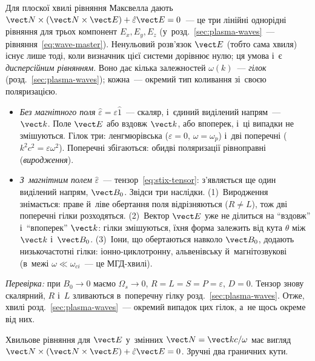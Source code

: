 \begin{Theory}
Для плоскої хвилі рівняння Максвелла дають $\vect N\times(\vect N\times\vect E)+\hat\varepsilon\vect E=0$~--- це
три лінійні однорідні рівняння для трьох компонент $E_x,E_y,E_z$ (у~розд.~\ref{sec:plasma-waves}~--- рівняння~\eqref{eq:wave-master}).
Ненульовий розв'язок $\vect E$ (тобто сама хвиля) існує лише тоді, коли визначник цієї системи дорівнює нулю; ця умова
і~є \emph{дисперсійним рівнянням}. Воно дає кілька залежностей $\omega(k)$~--- \emph{гілок} (розд.~\ref{sec:plasma-waves}); кожна~--- окремий тип коливання зі~своєю поляризацією.
\begin{itemize}
	\item \emph{Без магнітного поля} $\hat\varepsilon=\varepsilon\hat1$~--- скаляр, і~єдиний виділений напрям~--- $\vect k$.
	  Поле $\vect E$ або вздовж $\vect k$, або впоперек, і~ці випадки не змішуються. Гілок три: ленгмюрівська ($\varepsilon=0$,
	  $\omega=\omega_p$) і~дві поперечні ($k^2c^2=\varepsilon\omega^2$). Поперечні збігаються: обидві поляризації рівноправні
	  (\emph{виродження}).
	\item \emph{З~магнітним полем} $\hat\varepsilon$~--- тензор~\eqref{eq:stix-tensor}: з'являється ще один виділений напрям, $\vect B_0$. Звідси три наслідки.
	  (1)~Виродження знімається: праве й~ліве обертання поля відрізняються ($R\ne L$), тож дві поперечні гілки розходяться.
	  (2)~Вектор $\vect E$ уже не ділиться на \enquote{вздовж} і~\enquote{впоперек} $\vect k$: гілки змішуються, їхня форма залежить від кута $\theta$ між $\vect k$ і~$\vect B_0$.
	  (3)~Іони, що обертаються навколо $\vect B_0$, додають низькочастотні гілки: іонно-циклотронну, альвенівську й~магнітозвукові
	  (в~межі $\omega\ll\omega_{ci}$~--- це МГД-хвилі).
\end{itemize}
\emph{Перевірка:} при $B_0\to0$ маємо $\Omega_s\to0$, $R=L=S=P=\varepsilon$, $D=0$. Тензор знову скалярний, $R$ і~$L$ зливаються
в~поперечну гілку розд.~\ref{sec:plasma-waves}. Отже, хвилі розд.~\ref{sec:plasma-waves}~--- окремий випадок цих гілок, а~не щось окреме від них.
\end{Theory}

Хвильове рівняння для $\vect E$ у~змінних $\vect N=\vect k c/\omega$ має вигляд
$\vect N\times(\vect N\times\vect E)+\hat\varepsilon\vect E=0$. Зручні два граничних кути.


